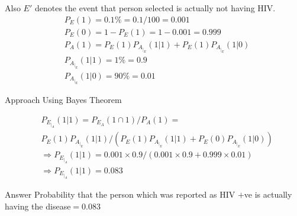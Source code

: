 \documentclass{beamer}
\begin{document}
	\begin{frame}
		Also    $E'$ denotes the event that person selected is actually not having HIV.
		\begin{align}
			&P_E(1)=0.1\%=0.1/100=0.001\\
			&P_E(0)=1-P_E(1)=1-0.001=0.999\\
			&P_A(1)=P_E(1)P_A_|_E(1|1)+P_E(1)P_A_|_E(1|0)\\
			&P_A_|_E(1|1)=1\%=0.9\\
			&P_A_|_E(1|0)=90\%=0.01
		\end{align}
		\begin{alertblock}{Approach}
			Using Bayes Theorem
		\end{alertblock}
		
		\begin{align}
			&P_E_|_A(1|1)=P_E_A(1 \cap 1)/P_A(1)=\\\nonumber
			&P_E(1)P_A_|_E(1|1)/(P_E(1)P_A_|_E(1|1)+P_E(0)P_A_|_E(1|0)) \\
			&\Rightarrow P_E_|_A(1|1)=0.001\times0.9/(0.001\times0.9+0.999\times0.01)\\
			&\Rightarrow P_E_|_A(1|1)=0.083 
		\end{align}
	\end{frame}
	
	\begin{frame}
		\begin{alertblock}{Answer}
			Probability that the person which was reported as HIV $+$ve is actually having the disease$=0.083$
		\end{alertblock}
	\end{frame}
	
\end{document}
